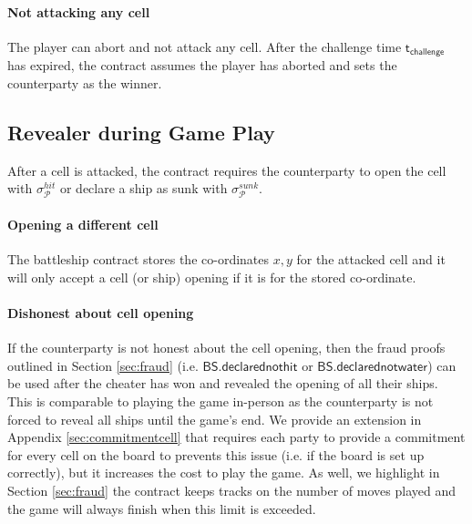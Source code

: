\documentclass{llncs}
\newcommand{\participant}{\mathcal{P}}
\newcommand{\battleshipdeclarednothit}{\mathsf{BS.declarednothit}}
\newcommand{\battleshipdeclarednotwater}{\mathsf{BS.declarednotwater}}
\newcommand{\timechallenge}{\mathsf{t}_{\mathsf{challenge}}}
\begin{document}
\paragraph{Not attacking any cell} 
The player can abort and not attack any cell. 
After the challenge time $\timechallenge$ has expired, the contract assumes the player has aborted and sets the counterparty as the winner. 

\subsection{Revealer during Game Play} 
After a cell is attacked, the contract requires the counterparty to open the cell with $\sigma^{hit}_{\participant}$ or declare a ship as sunk with  $\sigma^{sunk}_{\participant}$.

\paragraph{Opening a different cell}
The battleship contract stores the co-ordinates $x,y$ for the attacked cell and it will only accept a cell (or ship) opening if it is for the stored co-ordinate. 

\paragraph{Dishonest about cell opening}
If the counterparty is not honest about the cell opening, then the fraud proofs outlined in Section \ref{sec:fraud} (i.e. $\battleshipdeclarednothit$ or $\battleshipdeclarednotwater$) can be used after the cheater has won and revealed the opening of all their ships. 
This is comparable to playing the game in-person as the counterparty is not forced to reveal all ships until the game's end. 
We provide an extension in Appendix \ref{sec:commitmentcell} that requires each party to provide a commitment for every cell on the board to prevents this issue (i.e. if the board is set up correctly), but it increases the cost to play the game. 
As well, we highlight in Section \ref{sec:fraud} the contract keeps tracks on the number of moves played and the game will always finish when this limit is exceeded. 
\end{document}
